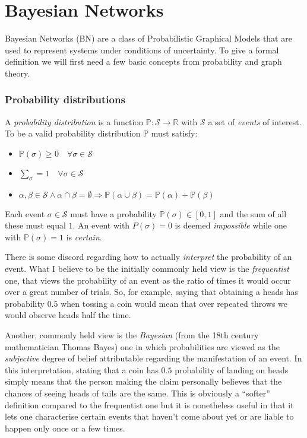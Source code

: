 
\section{Bayesian Networks}
Bayesian Networks (BN) are a class of Probabilistic Graphical Models that are used to represent systems under conditions of uncertainty.
To give a formal definition we will first need a few basic concepts from probability and graph theory.

\subsubsection{Probability distributions}
A \textit{probability distribution} is a function $\mathbb{P}: \mathcal{S} \rightarrow \mathbb{R}$ with $\mathcal{S}$ a set of \textit{events} of interest.  
To be a valid probability distribution $\mathbb{P}$ must satisfy:
\begin{itemize}
	\item $\mathbb{P}(\sigma) \geq 0 \quad \forall \sigma \in \mathcal{S}$
	\item $\sum_{\sigma} = 1 \quad \forall \sigma \in \mathcal{S}$
	\item $\alpha, \beta \in \mathcal{S} \wedge \alpha \cap \beta=\emptyset 	\Rightarrow \mathbb{P}(\alpha \cup \beta)=\mathbb{P}(\alpha)+\mathbb{P}(\beta)$
\end{itemize}
Each event $\sigma \in \mathcal{S}$ must have a probability $\mathbb{P}(\sigma) \in [0,1]$ and the sum of all these must equal $1$.  
An event with $P(\sigma) = 0$ is deemed \textit{impossible} while one with $\mathbb{P}(\sigma) = 1$ is \textit{certain}.

There is some discord regarding how to actually \textit{interpret} the probability of an event.
What I believe to be the initially commonly held view is the \textit{frequentist} one, that views the probability of an event as the ratio of times it would occur over a great number of trials.  
So, for example, saying that obtaining a heads has probability $0.5$ when tossing a coin would mean that over repeated throws we would observe heads half the time.

Another, commonly held view is the \textit{Bayesian} (from the 18th century mathematician Thomas Bayes) one in which probabilities are viewed as the \textit{subjective} degree of belief attributable regarding the manifestation of an event.
In this interpretation, stating that a coin has $0.5$ probability of landing on heads simply means that the person making the claim personally believes that the chances of seeing heads of tails are the same.
This is obviously a ``softer'' definition compared to the frequentist one but it is nonetheless useful in that it lets one characterise certain events that haven't come about yet or are liable to happen only once or a few times.

